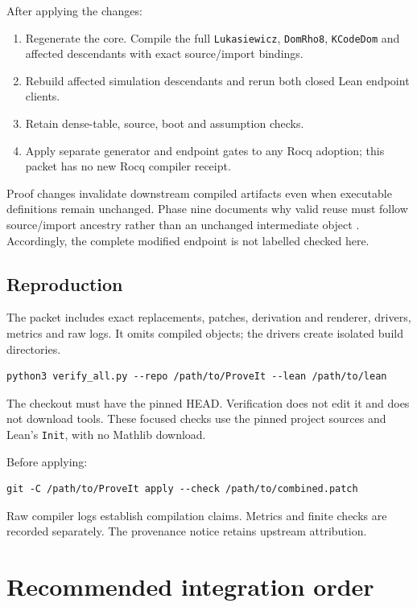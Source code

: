 \documentclass[11pt,letterpaper]{article}
\newcommand{\code}[1]{\texttt{#1}}
\begin{document}
After applying the changes:
\begin{enumerate}
\item Regenerate the core. Compile the full \code{Lukasiewicz},
\code{DomRho8}, \code{KCodeDom} and affected descendants with exact source/import
bindings.
\item Rebuild affected simulation descendants and rerun both closed Lean
endpoint clients.
\item Retain dense-table, source, boot and assumption checks.
\item Apply separate generator and endpoint gates to any Rocq adoption;
this packet has no new Rocq compiler receipt.
\end{enumerate}

Proof changes invalidate downstream compiled artifacts even when executable
definitions remain unchanged. Phase nine documents why valid reuse must follow
source/import ancestry rather than an unchanged intermediate object
\cite{phase9}. Accordingly, the complete modified endpoint is not labelled
checked here.

\subsection{Reproduction}

The packet includes exact replacements, patches, derivation and renderer,
drivers, metrics and raw logs. It omits compiled objects; the drivers create
isolated build directories.

\begin{lstlisting}
python3 verify_all.py --repo /path/to/ProveIt --lean /path/to/lean
\end{lstlisting}
The checkout must have the pinned HEAD. Verification does not edit it and does
not download tools. These focused checks use the pinned project sources and
Lean's \code{Init}, with no Mathlib download.

Before applying:
\begin{lstlisting}
git -C /path/to/ProveIt apply --check /path/to/combined.patch
\end{lstlisting}
Raw compiler logs establish compilation claims. Metrics and finite checks are
recorded separately. The provenance notice retains upstream attribution.

\section{Recommended integration order}
\end{document}

